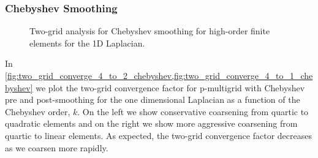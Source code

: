 \documentclass[review]{siamart190516}
\begin{document}
\subsubsection{Chebyshev Smoothing}

\begin{figure}[!tbp]
  \centering
  \caption{Two-grid analysis for Chebyshev smoothing for high-order finite elements for the 1D Laplacian.}
\end{figure}

In \cref{fig:two_grid_converge_4_to_2_chebyshev,fig:two_grid_converge_4_to_1_chebyshev} we plot the two-grid convergence factor for p-multigrid with Chebyshev pre and post-smoothing for the one dimensional Laplacian as a function of the Chebyshev order, $k$.
On the left we show conservative coarsening from quartic to quadratic elements and on the right we show more aggressive coarsening from quartic to linear elements.
As expected, the two-grid convergence factor decreases as we coarsen more rapidly.
\end{document}
